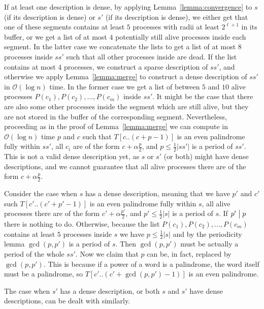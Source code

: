 \documentclass{article}[11pt,letter]
\newcommand{\bigo}{\mathcal{O}}
\newcommand{\divides}{\bigm|}
\newcommand{\kpers}{\ensuremath{p}}
\begin{document}
If at least one description is dense, by applying Lemma~\ref{lemma:convergence} to $s$ (if its description is dense) or $s'$ (if its description is dense), we either get that one of these
segments contains at least $5$ processes with radii at least $2^{\ell+1}$ in its buffer, or we get a list of at most $4$ potentially still alive processes
inside each segment.
In the latter case we concatenate the lists to get a list of at most $8$ processes inside $ss'$ such that all other processes
inside are dead. If the list contains at most $4$ processes, we construct a sparse description of $ss'$, and otherwise we apply Lemma~\ref{lemma:merge} to construct a dense description of $ss'$ in $\bigo(\log n)$ time.
In the former case we get a list of between $5$ and $10$ alive processes $P(c_{1}),P(c_{2}),\ldots,P(c_{m})$ inside $ss'$. It might be the case that 
there are also some other processes inside the segment which are still alive, but they are not stored in the buffer of the corresponding segment. Nevertheless,
proceeding as in the proof of Lemma~\ref{lemma:merge} we can compute in $\bigo(\log n)$ time $\kpers$ and $c$ such that $T[c..(c+\kpers-1)]$ is an even
palindrome fully within $ss'$, all $c_{i}$ are of the form $c+\alpha\frac{\kpers}{2}$, and $\kpers\leq\frac{1}{2}|ss'|$ is a period of $ss'$. This is not a valid 
dense description yet, as $s$ or $s'$ (or both) might have dense descriptions, and we cannot guarantee that all alive processes 
there are of the form $c+\alpha\frac{\kpers}{2}$.

Consider the case when $s$ has a dense description, meaning that we have $\kpers'$ and $c'$ such $T[c'..(c'+\kpers'-1)]$ is an even palindrome fully within $s$,
all alive processes there are of the form $c'+\alpha\frac{\kpers'}{2}$, and $\kpers'\leq \frac{1}{2}|s|$ is a period of $s$. If $\kpers'\divides\kpers$ there is nothing to do.
Otherwise, because the list $P(c_{1}),P(c_{2}),\ldots,P(c_{m})$ contains at least $5$ processes inside $s$ we have $\kpers\leq\frac{1}{2}|s|$ and
by the periodicity lemma $\gcd(\kpers,\kpers')$ is a period of $s$. Then $\gcd(\kpers,\kpers')$ must be actually a period of the whole $ss'$. 
Now we claim that $\kpers$ can be, in fact, replaced by $\gcd(\kpers,\kpers')$. This is because if a power of a word is a palindrome, the word itself must be a palindrome,
so $T[c'..(c'+\gcd(\kpers,\kpers')-1)]$ is an even palindrome.

The case when $s'$ has a dense description, or both $s$ and $s'$ have dense descriptions, can be dealt with similarly.
\end{document}
